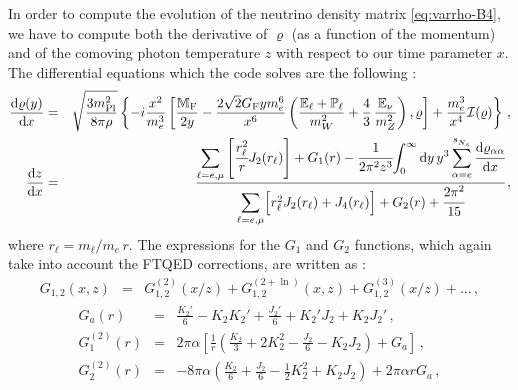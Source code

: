 \documentclass[notitlepage,showpacs,preprintnumbers,amsmath,amssymb,superscriptaddress,prd,onecolumn]{revtex4-1}
\begin{document}
In order to compute the evolution of the neutrino density matrix \eqref{eq:varrho-B4},
we have to compute both the derivative of $\varrho$ (as a function of the momentum)
and of the comoving photon temperature $z$
with respect to our time parameter $x$.
The differential equations which the code solves are the following
\cite{deSalas:2016ztq,Mirizzi:2012we,Saviano:2013ktj,Mangano:2001iu}:
%
\begin{eqnarray}
\label{eq:drho_dx_nxn}
\frac{{\rm d}\varrho(y)}{{\rm d}x}
&=&
\sqrt{\frac{3 m^2_{\rm Pl}}{8\pi\rho}}
\left\{
    -i \frac{x^2}{m_e^3}
    \left[
        \frac{\mathbb{M}_{\rm F}}{2y}
        -
        \frac{2\sqrt{2}G_{\rm F} y m_e^6}{x^6}
        \left(
            \frac{\mathbb{E}_\ell+\mathbb{P}_\ell}{m_W^2}
            +
            \frac{4}{3}\,\frac{\mathbb{E}_\nu}{m_Z^2}
        \right),
    \varrho
    \right]
    +\frac{m_e^3}{x^4}\mathcal{I(\varrho)}
\right\}\,,
\\
\label{eq:dz_dx_nxn}
\frac{\mathrm{d}z}{\mathrm{d}x}
&=&
\cfrac{
{\displaystyle \sum_{\ell=e,\mu}}
\left[
\cfrac{r_\ell^2}{r} J_2(r_\ell)
\right]
+ G_1(r)
- \cfrac{1}{2\pi^2z^3}
    {\displaystyle \int_0^\infty \mathrm{d}y\,y^3\sum_{\alpha=e}^{s_{N_s}^{}}\cfrac{\mathrm{d}\varrho_{\alpha \alpha}}{\mathrm{d}x}}
}{
{\displaystyle \sum_{\ell=e,\mu}}
\Big[
r^2_\ell J_2(r_\ell)
+ J_4(r_\ell)
\Big]
+ G_2(r)
+ \cfrac{2\pi^2}{15}
}\,,
\end{eqnarray}
where $r_\ell=m_\ell/m_e\,r$.
The expressions for the $G_1$ and $G_2$ functions,
which again take into account the FTQED corrections, are written as
\cite{Mangano:2001iu,Bennett:2019ewm}:
%
\begin{eqnarray}
G_{1,2}(x,z)
&=&
G_{1,2}^{(2)}(x/z)
+
G_{1,2}^{(2+\ln)}(x,z)
+
G_{1,2}^{(3)}(x/z)
+
\ldots
\,,
\end{eqnarray}
%
\begin{eqnarray}
G_a(r)
&=&
\frac{K_2'}{6}
-K_2K_2'
+\frac{J_2'}{6}
+K_2'J_2
+K_2J_2'
\,,\\
G_1^{(2)}(r)
&=&
2\pi\alpha
\left[
  \frac{1}{r}
  \left(
    \frac{K_2}{3}
    + 2 K_2^2
    -\frac{J_2}{6}
    -K_2J_2
  \right)
  +
  G_a
\right]
\label{eq:g1}
\,,\\
G_2^{(2)}(r)
&=&
-8\pi\alpha
\left(
  \frac{K_2}{6}
  +\frac{J_2}{6}
  -\frac{1}{2}K_2^2
  +K_2J_2
\right)
+
2\pi\alpha r
G_a
\label{eq:g2}
\,,
\end{eqnarray}
%
\end{document}
